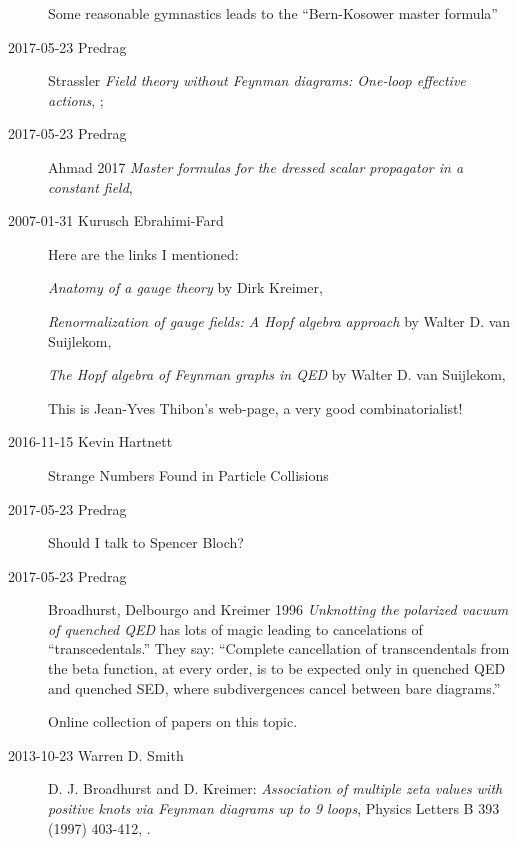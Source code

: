 \begin{description}
Some reasonable gymnastics leads to the ``Bern-Kosower master
formula''

\item[2017-05-23 Predrag]
Strassler
{\em Field theory without {Feynman} diagrams: {One}-loop effective actions},
;

\item[2017-05-23 Predrag]
Ahmad \etal{} 2017
{\em Master formulas for the dressed scalar propagator in a constant field},

\item[2007-01-31 Kurusch Ebrahimi-Fard]
 \label{sect:BrDeKr96}
Here are the links I mentioned:

\emph{Anatomy of a gauge theory} by
Dirk Kreimer,

\emph{Renormalization of gauge fields: A Hopf algebra approach} by
Walter D. van Suijlekom,

\emph{The Hopf algebra of Feynman graphs in QED} by
Walter D. van Suijlekom,

This is Jean-Yves Thibon's
 {web-page},
a very good combinatorialist!

\item[2016-11-15 Kevin Hartnett]
{Strange Numbers Found in Particle Collisions}

\item[2017-05-23 Predrag] Should I talk to
 {Spencer Bloch}?

\item[2017-05-23 Predrag]
Broadhurst, Delbourgo and Kreimer 1996
{\em Unknotting the polarized vacuum of quenched {QED}} has
lots of magic leading to cancelations of ``transcedentals.''
They say: ``Complete cancellation of transcendentals from the
beta function, at every order, is to be expected only in
quenched QED and quenched SED, where subdivergences
cancel between bare diagrams.''

 Online collection of papers on
 {this topic}.


\item[2013-10-23  Warren D. Smith]

D. J. Broadhurst and D. Kreimer:
\emph{Association of multiple zeta values with positive knots via Feynman
diagrams up to 9 loops},
Physics Letters B 393 (1997) 403-412,
.


\end{description}
